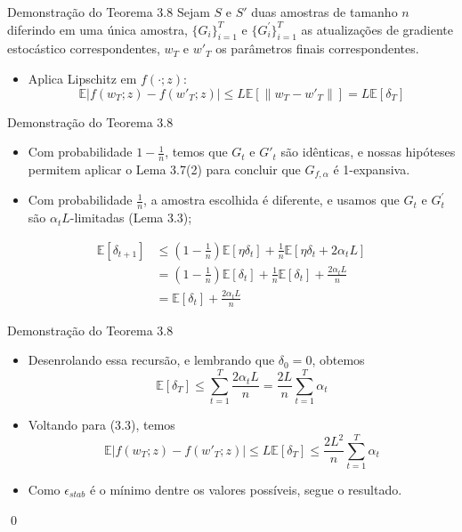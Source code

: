 \documentclass{beamer}
\newcommand{\EE}{\mathbb{E}}
\begin{document}
\begin{frame}{Demonstração do Teorema 3.8} 
Sejam $S$ e \(S'\) duas amostras de tamanho $n$ diferindo em uma única amostra, $\{G_i\}_{i=1}^{T}$ e $\{G_i^\prime\}_{i=1}^{T}$ as atualizações de gradiente estocástico correspondentes, $w_T$ e $w'_T$ os parâmetros finais correspondentes.



\begin{itemize}
    \item Aplica Lipschitz em \(f(\cdot;z)\):
    \begin{equation*}        \tag{3.3}
        \EE|f(w_{T};z) - f(w'_{T};z)| \le L\EE[\|w_{T} - w'_{T}\|] = L\EE[\delta_{T}]
    \end{equation*}
\end{itemize}

\end{frame}
\begin{frame}{Demonstração do Teorema 3.8}
    
\begin{itemize} 
    \item Com probabilidade $1-\frac{1}{n}$, temos que $G_t$ e $G'_t$ são idênticas, e nossas hipóteses permitem aplicar o Lema 3.7(2) para concluir que \(G_{f,\alpha}\) é 1-expansiva.
    \item Com probabilidade $\frac{1}{n}$, a amostra escolhida é diferente, e usamos que $G_t$ e $G_t^\prime$ são $\alpha_tL$-limitadas (Lema 3.3);
\end{itemize}
\begin{align*}\tag{3.4}
    \EE[\delta_{t+1}] &\le \left(1-\frac{1}{n}\right)\EE[\eta\delta_{t}] + \frac{1}{n}\EE[\eta\delta_{t} + 2\alpha_t L] \\
    &= \left(1-\frac{1}{n}\right)\EE[\delta_{t}] + \frac{1}{n}\EE[\delta_{t}] + \frac{2\alpha_t L}{n} \\
    &= \EE[\delta_{t}] + \frac{2\alpha_t L}{n}
\end{align*}
\end{frame}

\begin{frame}{Demonstração do Teorema 3.8}
    \begin{itemize}
        \item Desenrolando essa recursão, e lembrando que $\delta_0=0$, obtemos
$$ \EE[\delta_{T}] \le \sum_{t=1}^{T} \frac{2\alpha_t L}{n} = \frac{2L}{n}\sum_{t=1}^{T}\alpha_t $$
\item Voltando para (3.3), temos
 $$ \EE|f(w_{T};z) - f(w'_{T};z)| \le L\EE[\delta_{T}] \le \frac{2L^2}{n}\sum_{t=1}^{T}\alpha_{t} $$
 \item Como $\epsilon_{stab} $ é o mínimo dentre os valores possíveis, segue o resultado.
    \end{itemize}
    \qed
\end{frame}
\end{document}
